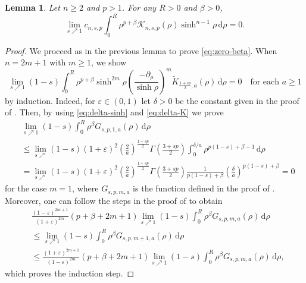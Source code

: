 \documentclass[11pt]{amsart}
\theoremstyle{plain}
\newtheorem{lemma}[theorem]{Lemma}
\theoremstyle{definition}
\numberwithin{equation}{section}
\begin{document}
\begin{lemma} \label{lem:zero-beta}
Let $n\geq 2$ and $p > 1$. For any $R > 0$ and $\beta > 0$,
\begin{equation} \label{eq:zero-beta}
\lim_{s \nearrow 1} c_{n,s,p} \int_{0}^{R} \rho^{p+\beta} \mathcal{K}_{n,s,p}(\rho)\sinh^{n-1}\rho \,\mathrm{d}\rho = 0.
\end{equation}
\end{lemma}

\begin{proof}
We proceed as in the previous lemma to prove \eqref{eq:zero-beta}. When $n=2m+1$ with $m \geq 1$, we show
\begin{equation*}
\lim_{s \nearrow 1} (1-s) \int_{0}^{R} \rho^{p+\beta} \sinh^{2m}\rho \left( \frac{-\partial_\rho}{\sinh \rho} \right)^{m} \widetilde{K}_{\frac{1+sp}{2},a}(\rho) \,\mathrm{d}\rho = 0 \quad\text{for each } a \geq 1
\end{equation*}
by induction. Indeed, for $\varepsilon \in (0,1)$ let $\delta > 0$ be the constant given in the proof of . Then, by using \eqref{eq:delta-sinh} and \eqref{eq:delta-K} we prove
\begin{equation*}
\begin{split}
&\lim_{s \nearrow 1} (1-s) \int_{0}^{R} \rho^{\beta} G_{s, p, 1, a}(\rho) \,\mathrm{d}\rho \\
&\leq \lim_{s \nearrow} (1-s)(1+\varepsilon)^{2} \left( \frac{2}{a} \right)^{\frac{1+sp}{2}} \Gamma\left( \frac{3+sp}{2} \right) \int_{0}^{\delta/a} \rho^{p(1-s)+\beta-1} \,\mathrm{d}\rho \\
&= \lim_{s \nearrow} (1-s)(1+\varepsilon)^{2} \left( \frac{2}{a} \right)^{\frac{1+sp}{2}} \Gamma\left( \frac{3+sp}{2} \right) \frac{1}{p(1-s)+\beta} \left( \frac{\delta}{a} \right)^{p(1-s)+\beta} = 0
\end{split}
\end{equation*}
for the case $m=1$, where $G_{s, p, m, a}$ is the function defined in the proof of . Moreover, one can follow the steps in the proof of  to obtain
\begin{equation*}
\begin{split}
&\frac{(1-\varepsilon)^{2m+1}}{(1+\varepsilon)^{2m}} (p+\beta+2m+1) \lim_{s \nearrow 1} (1-s) \int_{0}^{R} \rho^{\beta} G_{s, p, m, a}(\rho) \,\mathrm{d}\rho \\
&\leq \lim_{s \nearrow 1} (1-s) \int_{0}^{R} \rho^{\beta} G_{s, p, m+1, a}(\rho) \,\mathrm{d}\rho \\
&\leq \frac{(1+\varepsilon)^{2m+1}}{(1-\varepsilon)^{2m}} (p+\beta+2m+1) \lim_{s \nearrow 1} (1-s) \int_{0}^{R} \rho^{\beta} G_{s, p, m, a}(\rho) \,\mathrm{d}\rho,
\end{split}
\end{equation*}
which proves the induction step.


\end{proof}
\end{document}
